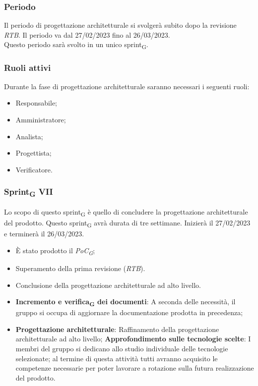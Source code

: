 \subsubsection{Periodo}
Il periodo di progettazione architetturale si svolgerà subito dopo la revisione \textit{RTB}. Il periodo va dal 27/02/2023 fino al 26/03/2023.\\
Questo periodo sarà svolto in un unico sprint\textsubscript{G}.

\subsubsection{Ruoli attivi}
Durante la fase di progettazione architetturale saranno necessari i seguenti ruoli:
\begin{itemize}
	\item Responsabile;
    \item Amministratore;
    \item Analista;
    \item Progettista;
    \item Verificatore.
\end{itemize}

\subsubsection{Sprint\textsubscript{G} VII}
Lo scopo di questo sprint\textsubscript{G} è quello di concludere la progettazione architetturale del prodotto.
Questo sprint\textsubscript{G} avrà durata di tre settimane. Inizierà il 27/02/2023 e terminerà il 26/03/2023.

\:
\begin{itemize}
    \item È stato prodotto il \textit{PoC\textsubscript{G}};
    \item Superamento della prima revisione (\textit{RTB}).
\end{itemize}

\:
\begin{itemize}
    \item Conclusione della progettazione architetturale ad alto livello.
\end{itemize}

\:
\begin{itemize}
    \item \textbf{Incremento e verifica\textsubscript{G} dei documenti}: A seconda delle necessità, il gruppo si occupa di aggiornare la documentazione prodotta in precedenza;
    \item \textbf{Progettazione architetturale}: Raffinamento della progettazione architetturale ad alto livello;
        \subitem \textbf{Approfondimento sulle tecnologie scelte}: I membri del gruppo si dedicano allo studio individuale delle tecnologie selezionate; al termine di questa attività tutti avranno acquisito le competenze necessarie per poter lavorare a rotazione sulla futura realizzazione del prodotto.
\end{itemize}

